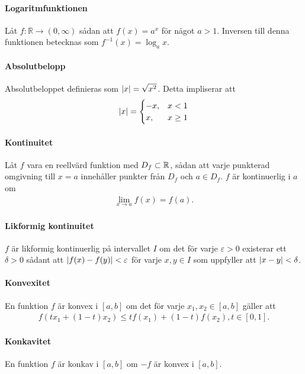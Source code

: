 \paragraph{Logaritmfunktionen}

Låt $f:\mathbb{R}\to (0,\infty)$ sådan att $f(x) = a^x$ för något $a > 1$. Inversen till denna funktionen betecknas som $f^{-1}(x) = \log_a x$.

\paragraph{Absolutbelopp}

Absolutbeloppet definieras som $\abs{x} = \sqrt{x^2}$. Detta impliserar att
\begin{align*}
	\abs{x} =
	\begin{cases}
		-x, & x < 1\\
		x,  & x \geq 1
	\end{cases}
\end{align*}
 
\paragraph{Kontinuitet}
Låt $f$ vara en reellvärd funktion med $D_f\subset\mathbb{R}$, sådan att varje punkterad omgivning till $x = a$ innehåller punkter från $D_f$ och $a\in D_f$. $f$ är kontinuerlig i $a$ om
\begin{align*}
	\lim\limits_{x\to a}f(x) = f(a).
\end{align*}

\paragraph{Likformig kontinuitet}
$f$ är likformig kontinuerlig på intervallet $I$ om det för varje $\varepsilon > 0$ existerar ett $\delta > 0$ sådant att $\abs{f(x) - f(y)} < \varepsilon$ för varje $x, y\in I$ som uppfyller att $\abs{x - y} < \delta$.

\paragraph{Konvexitet}
En funktion $f$ är konvex i $[a, b]$ om det för varje $x_1, x_2\in [a, b]$ gäller att
\begin{align*}
	f(tx_1 + (1 - t)x_2)\leq tf(x_1) + (1-t)f(x_2), t\in [0, 1].
\end{align*}

\paragraph{Konkavitet}
En funktion $f$ är konkav  i $[a, b]$ om $-f$ är konvex i $[a, b]$.

